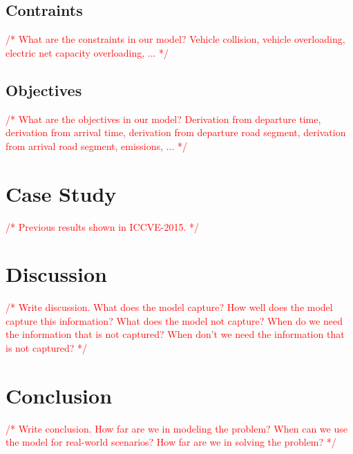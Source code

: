 \documentclass[conference]{IEEEtran}
\newcommand{\todo}[1]{\textcolor{red}{/* #1 */}}
\begin{document}
	\subsection{Contraints}
	
	\todo{What are the constraints in our model? Vehicle collision, vehicle overloading, electric net capacity overloading, ...}
	
	\subsection{Objectives}
	
	\todo{What are the objectives in our model? Derivation from departure time, derivation from arrival time, derivation from departure road segment, derivation from arrival road segment, emissions, ...}
	
	\section{Case Study}
	
	\todo{Previous results shown in ICCVE-2015.}
	
	\section{Discussion}
	\label{discussion}
	
	\todo{Write discussion. What does the model capture? How well does the model capture this information? What does the model not capture? When do we need the information that is not captured? When don't we need the information that is not captured?}
	
	\section{Conclusion}
	\label{conclusion}
	
	\todo{Write conclusion. How far are we in modeling the problem? When can we use the model for real-world scenarios? How far are we in solving the problem?}
	
	
	
	
\end{document}
